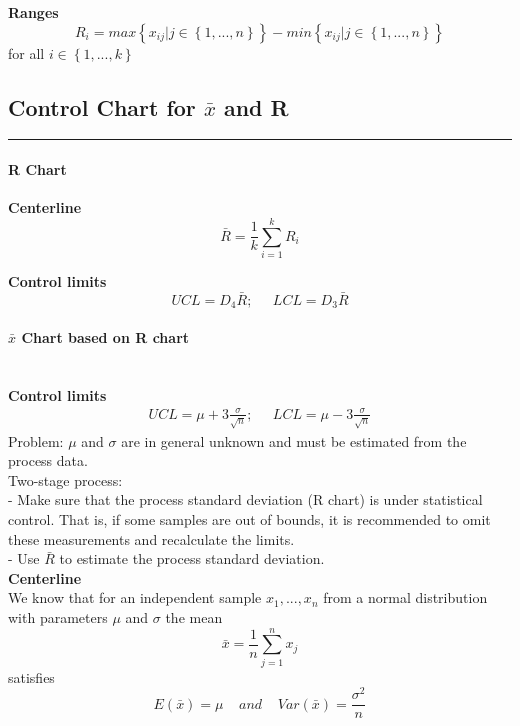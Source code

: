 \textbf{Ranges}
\begin{equation}
  R_i = max\left \{x_{ij} | j \in \left \{1,...,n\right \} \right \} - min\left \{x_{ij} | j \in \left \{1,...,n\right \} \right \}
\end{equation}
for all $i \in \left \{1,...,k\right \}$

\subsection{Control Chart for $\bar{x}$ and R}
\noindent\rule[\linienAbstand]{\linewidth}{\linienDicke}
\paragraph{R Chart}\mbox{}
\textbf{Centerline}
\begin{equation}
  \bar{R} = \frac{1}{k} \sum^k_{i=1} R_i
\end{equation}

\textbf{Control limits}
\begin{equation}
    UCL = D_4 \bar{R}; \;\;\;\;\; LCL = D_3 \bar{R}
\end{equation}

\paragraph{$\bar{x}$ Chart based on R chart}\mbox{}\\
\textbf{Control limits}
\begin{equation}
  \begin{split}
    UCL = \mu + 3 \frac{\sigma}{\sqrt{n}}; \;\;\;\;\;  LCL = \mu - 3 \frac{\sigma}{\sqrt{n}}
  \end{split}
\end{equation}
Problem: $\mu$ and $\sigma$ are in general unknown and must be estimated from the process data.\\
Two-stage process:\\
 - Make sure that the process standard deviation (R chart) is under statistical control. That is, if some samples are out of bounds, it is recommended
to omit these measurements and recalculate the limits.\\
 - Use $\bar{R}$ to estimate the process standard deviation.\\

\textbf{Centerline}\\
We know that for an independent sample $x_1, ... ,x_n$ from a normal distribution with parameters $\mu$ and $\sigma$ the mean
\begin{equation}
  \bar{x} = \frac{1}{n} \sum_{j=1}^n x_{j}
\end{equation}
satisfies
\begin{equation}
  E\left(\bar{x}\right) = \mu \;\;\;\; and \;\;\;\; Var\left(\bar{x}\right) = \frac{\sigma^2}{n}
\end{equation}

